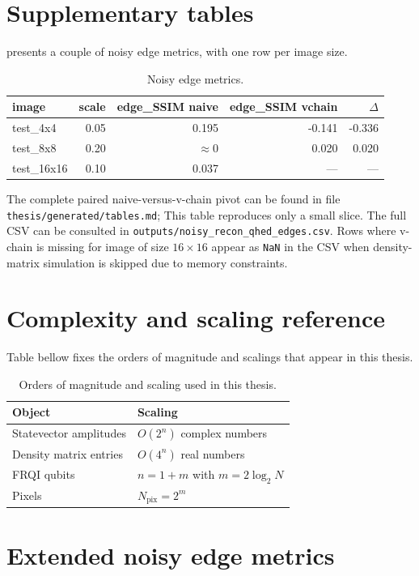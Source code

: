 \chapter{Supplementary tables}

 presents a couple of noisy edge metrics, with one row per image size.
\begin{table}[htbp]
\centering
\caption{Noisy edge metrics.}
\label{tab:noisy-wide-excerpt}
\footnotesize
\begin{tabular}{lrrrr}
\toprule
image & scale & edge\_SSIM naive & edge\_SSIM vchain & $\Delta$ \\
\midrule
test\_4x4 & 0.05 & 0.195 & -0.141 & -0.336 \\
test\_8x8 & 0.20 & $\approx 0$ & 0.020 & 0.020 \\
test\_16x16 & 0.10 & 0.037 & --- & --- \\
\bottomrule
\end{tabular}
\end{table}
The complete paired naive-versus-v-chain pivot can be found in file \texttt{thesis/generated/tables.md}; This table reproduces only a small slice. The full CSV can be consulted in \texttt{outputs/noisy\_recon\_qhed\_edges.csv}. Rows where v-chain is missing for image of size $16\times16$ appear as \texttt{NaN} in the CSV when density-matrix simulation is skipped due to memory constraints.

\chapter{Complexity and scaling reference}

Table bellow fixes the orders of magnitude and scalings that appear in this thesis.
\begin{table}[htbp]
\centering
\caption{Orders of magnitude and scaling used in this thesis.}
\begin{tabular}{ll}
\toprule
Object & Scaling \\
\midrule
Statevector amplitudes & $O(2^n)$ complex numbers \\
Density matrix entries & $O(4^n)$ real numbers \\
FRQI qubits & $n = 1 + m$ with $m=2\log_2 N$ \\
Pixels & $N_{\mathrm{pix}} = 2^m$ \\
\bottomrule
\end{tabular}
\end{table}

\chapter{Extended noisy edge metrics}

